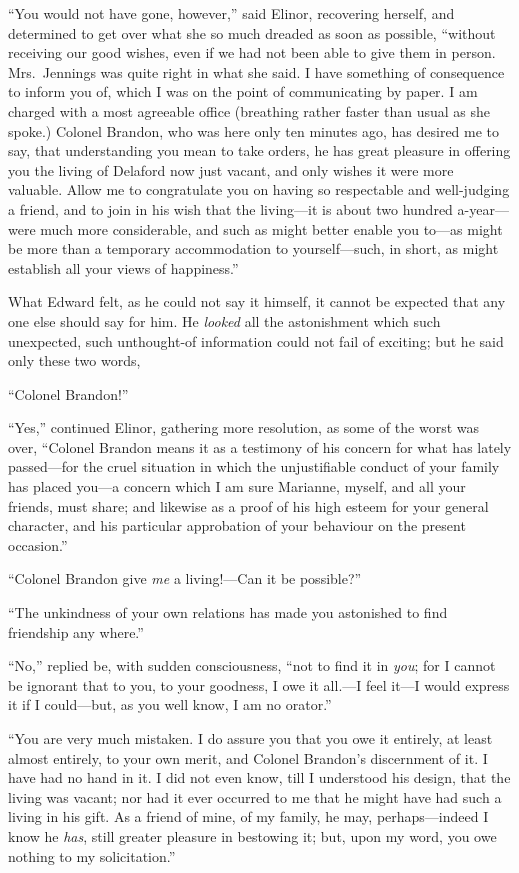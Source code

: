 \documentclass{article}
\begin{document}
``You would not have gone, however,'' said Elinor,
recovering herself, and determined to get over what she
so much dreaded as soon as possible, ``without receiving
our good wishes, even if we had not been able to give them
in person.  Mrs.\ Jennings was quite right in what she said.
I have something of consequence to inform you of,
which I was on the point of communicating by paper.
I am charged with a most agreeable office (breathing
rather faster than usual as she spoke.)  Colonel Brandon,
who was here only ten minutes ago, has desired me to say,
that understanding you mean to take orders, he has
great pleasure in offering you the living of Delaford
now just vacant, and only wishes it were more valuable.
Allow me to congratulate you on having so respectable
and well-judging a friend, and to join in his wish that
the living---it is about two hundred a-year---were much
more considerable, and such as might better enable you
to---as might be more than a temporary accommodation to
yourself---such, in short, as might establish all your views
of happiness.''

What Edward felt, as he could not say it himself,
it cannot be expected that any one else should say for him.
He \emph{looked} all the astonishment which such unexpected,
such unthought-of information could not fail of exciting;
but he said only these two words,

``Colonel Brandon!''

``Yes,'' continued Elinor, gathering more resolution,
as some of the worst was over, ``Colonel Brandon means
it as a testimony of his concern for what has lately
passed---for the cruel situation in which the unjustifiable
conduct of your family has placed you---a concern
which I am sure Marianne, myself, and all your friends,
must share; and likewise as a proof of his high esteem
for your general character, and his particular approbation
of your behaviour on the present occasion.''

``Colonel Brandon give \emph{me} a living!---Can it be possible?''

``The unkindness of your own relations has made you
astonished to find friendship any where.''

``No,'' replied be, with sudden consciousness, ``not to
find it in \emph{you}; for I cannot be ignorant that to you,
to your goodness, I owe it all.---I feel it---I would express
it if I could---but, as you well know, I am no orator.''

``You are very much mistaken.  I do assure you
that you owe it entirely, at least almost entirely,
to your own merit, and Colonel Brandon's discernment
of it.  I have had no hand in it.  I did not even know,
till I understood his design, that the living was vacant;
nor had it ever occurred to me that he might have
had such a living in his gift.  As a friend of mine,
of my family, he may, perhaps---indeed I know he \emph{has},
still greater pleasure in bestowing it; but, upon my word,
you owe nothing to my solicitation.''
\end{document}

